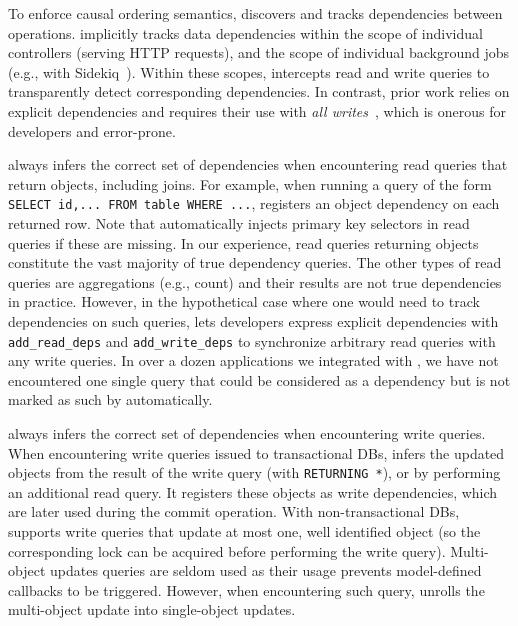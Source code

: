 To enforce causal ordering semantics, \synapse discovers and tracks
dependencies between \mbox{operations}.
\synapse implicitly tracks data dependencies within the scope of individual
controllers (serving HTTP requests), and the scope of individual background jobs (e.g., with
Sidekiq~\cite{sidekiq}). Within these scopes, \synapse intercepts read and
write queries to transparently detect corresponding dependencies.
In contrast, prior work relies on
explicit dependencies and requires their use with {\em all writes}~\cite{bolton,Bailis:2012:PDC:2391229.2391251}, which is onerous for developers and
error-prone.

\synapse always infers the correct set of dependencies when encountering read
queries that return objects, including joins. For example, when running a query
of the form {\tt SELECT id,... FROM table WHERE ...}, \synapse registers an
object dependency on each returned row. Note that \synapse automatically injects
primary key selectors in read queries if these are missing.
In our experience, read queries returning objects constitute the vast majority
of true dependency queries. The other types of read queries are aggregations
(e.g., count) and their results are not true dependencies in practice. However,
in the hypothetical case where one would need to track dependencies on such
queries, \synapse lets developers express explicit dependencies with 
{\tt add\_read\_deps} and {\tt add\_write\_deps}
to synchronize arbitrary read queries with any write queries.
In over a dozen applications we integrated with \synapse, we have not
encountered one single query that could be considered as a dependency but is not
marked as such by \synapse automatically.  

\synapse always infers the correct set of dependencies when
encountering write queries.
When encountering write queries issued to transactional DBs, \synapse infers
the updated objects from the result of the write query (with {\tt RETURNING
*}), or by performing an additional read query.  It registers these objects as
write dependencies, which are later used during the commit operation. With
non-transactional DBs, \synapse supports write queries that update at most one,
well identified object (so the corresponding lock can be acquired before
performing the write query).  Multi-object updates queries are seldom used as
their usage prevents model-defined callbacks to be triggered. However, when
encountering such query, \synapse unrolls the multi-object update into
single-object updates.


